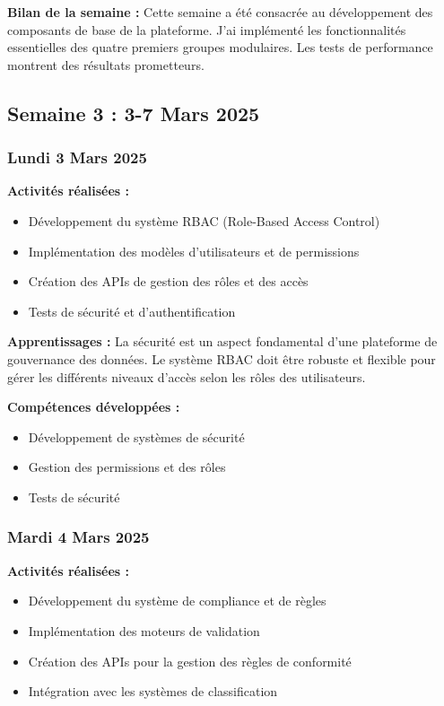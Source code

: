 \documentclass[12pt,a4paper]{article}
\begin{document}
\textbf{Bilan de la semaine :}
Cette semaine a été consacrée au développement des composants de base de la plateforme. J'ai implémenté les fonctionnalités essentielles des quatre premiers groupes modulaires. Les tests de performance montrent des résultats prometteurs.

\clearpage
\subsection{Semaine 3 : 3-7 Mars 2025}

\subsubsection{Lundi 3 Mars 2025}
\textbf{Activités réalisées :}
\begin{itemize}
    \item Développement du système RBAC (Role-Based Access Control)
    \item Implémentation des modèles d'utilisateurs et de permissions
    \item Création des APIs de gestion des rôles et des accès
    \item Tests de sécurité et d'authentification
\end{itemize}

\textbf{Apprentissages :}
La sécurité est un aspect fondamental d'une plateforme de gouvernance des données. Le système RBAC doit être robuste et flexible pour gérer les différents niveaux d'accès selon les rôles des utilisateurs.

\textbf{Compétences développées :}
\begin{itemize}
    \item Développement de systèmes de sécurité
    \item Gestion des permissions et des rôles
    \item Tests de sécurité
\end{itemize}

\subsubsection{Mardi 4 Mars 2025}
\textbf{Activités réalisées :}
\begin{itemize}
    \item Développement du système de compliance et de règles
    \item Implémentation des moteurs de validation
    \item Création des APIs pour la gestion des règles de conformité
    \item Intégration avec les systèmes de classification
\end{itemize}
\end{document}
